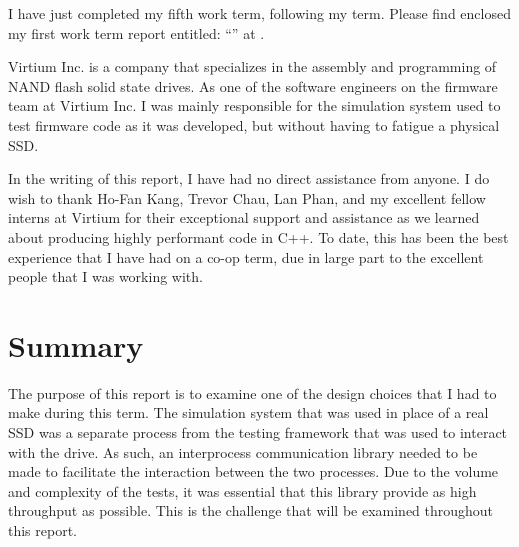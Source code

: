 \documentclass[se]{uw-wkrpt}
\begin{document}
\begin{letter}
I have just completed my fifth work term, following my \theterm{} term.
Please find enclosed my first work term report entitled:
``\thetitle'' at \theemployer.  

Virtium Inc. is a company that specializes in the assembly and programming of
NAND flash solid state drives. As one of the software engineers on the 
firmware team at Virtium Inc. I was mainly responsible for the simulation 
system used to test firmware code as it was developed, but without having 
to fatigue a physical SSD.

In the writing of this report, I have had no direct assistance from anyone. 
I do wish to thank Ho-Fan Kang, Trevor Chau, Lan Phan, and my excellent fellow
interns at Virtium for their exceptional support and assistance as we learned
about producing highly performant code in C++. To date, this has been the best
experience that I have had on a co-op term, due in large part to the excellent
people that I was working with.

\end{letter}

\tableofcontents

\section{Summary}

The purpose of this report is to examine one of the design choices that I
had to make during this term. The simulation system that was used in place
of a real SSD was a separate process from the testing framework that was
used to interact with the drive. As such, an interprocess communication
library needed to be made to facilitate the interaction between the two processes.
Due to the volume and complexity of the tests, it was essential that this
library provide as high throughput as possible. This is the challenge that will
be examined throughout this report.
\end{document}
